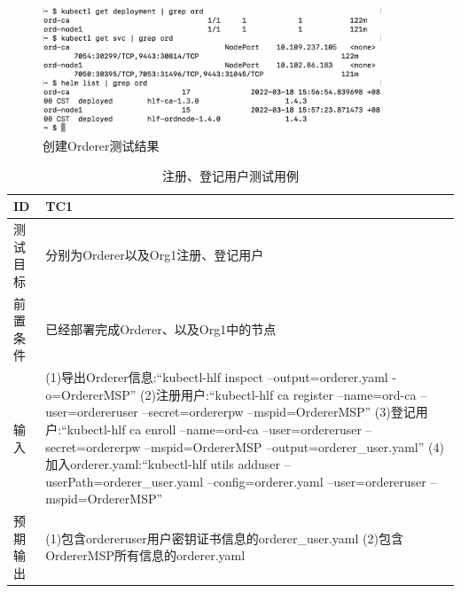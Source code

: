 \begin{figure}[h] %
    \centering %
    \includegraphics[width=0.9\textwidth]{FIGs/chapter5/orderer.png} %
    \caption{创建Orderer测试结果} %
    \label{testcase2result} %
\end{figure}%

{\footnotesize
\begin{longtable}[h]{m{40pt}|m{300pt}}
    \caption[注册、登记用户测试用例]{注册、登记用户测试用例} \label{reg_enroll_test}\\
        \hline  
        ID&TC1\\
        \hline
        测试目标&分别为Orderer以及Org1注册、登记用户\\
        \hline
        前置条件&已经部署完成Orderer、以及Org1中的节点\\
        \hline
        输入& (1)导出Orderer信息:“kubectl-hlf inspect --output=orderer.yaml -o=OrdererMSP”
        \newline (2)注册用户:“kubectl-hlf ca register --name=ord-ca --user=ordereruser --secret=ordererpw --mspid=OrdererMSP”
        \newline (3)登记用户:“kubectl-hlf ca enroll --name=ord-ca --user=ordereruser --secret=ordererpw --mspid=OrdererMSP --output=orderer\_user.yaml”
        \newline (4)加入orderer.yaml:“kubectl-hlf utils adduser --userPath=orderer\_user.yaml --config=orderer.yaml --user=ordereruser --mspid=OrdererMSP”\\

        \hline 
        预期输出& (1)包含ordereruser用户密钥证书信息的orderer\_user.yaml
        \newline (2)包含OrdererMSP所有信息的orderer.yaml\\
        \hline
    \end{longtable} 
}

